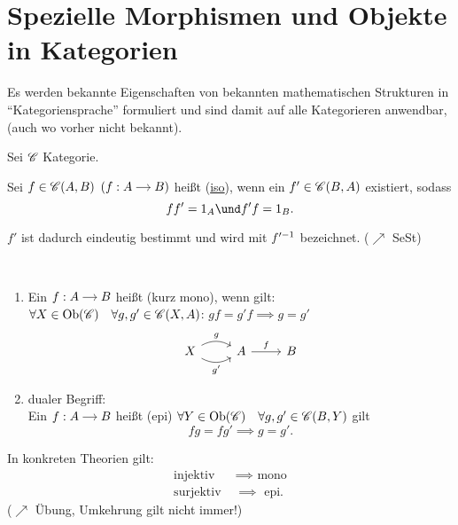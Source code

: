 \chapter{Spezielle Morphismen und Objekte in Kategorien}
\begin{bemerkung}
	Es werden bekannte Eigenschaften von bekannten mathematischen Strukturen in ``Kategoriensprache'' formuliert und sind damit auf alle Kategorieren anwendbar, (auch wo vorher nicht bekannt).
\end{bemerkung}
Sei $\mathscr C$ Kategorie.
\begin{definition}[Isomorphismus]
	Sei $f \in \mathscr C(A,B)$ $(f: \begin{tikzcd}[cramped, sep=small]
	A \arrow[r] & B
	\end{tikzcd})$ heißt  (\ul{iso}), wenn ein $f' \in \mathscr C(B,A)$ existiert, sodass
	\[
		ff' = 1_A \und f' f = 1_B.
	\]
\end{definition}
\begin{bemerkung}
	$f'$ ist dadurch eindeutig bestimmt und wird mit $f'^{-1}$ bezeichnet. ($\nearrow$ SeSt)
\end{bemerkung}
\begin{definition}\
	\begin{enumerate}[label=]
		\item Ein $f: \begin{tikzcd}[cramped, sep=small]
		A \arrow[r] & B
		\end{tikzcd}$ heißt  (kurz mono), wenn gilt:\\
		$\forall X \in \operatorname{Ob}(\mathscr C) \quad \forall g,g' \in \mathscr C(X,A)$: $gf = g'f \implies g = g'$
		\[
		\begin{tikzcd}
		X \arrow[r, bend left, "g"] \arrow[r, bend right, "{g'}"'] & A \arrow[r, "f"] & B
		\end{tikzcd}
		\]
		\item dualer Begriff:\\
		Ein $f: \begin{tikzcd}[cramped, sep=small]
		A \arrow[r] & B
		\end{tikzcd}$ heißt  (epi) $\forall Y \in \operatorname{Ob}(\mathscr C)\quad \forall g,g' \in \mathscr C(B,Y)$ gilt
		\[
		fg = fg' \implies g=g'.
		\]
	\end{enumerate}
\end{definition}
\begin{bemerkung}
	In konkreten Theorien gilt:
	\begin{align*}
		\text{injektiv} &\implies \text{ mono}\\
		\text{surjektiv } &\implies \text{ epi}.
	\end{align*}
	($\nearrow$ Übung, Umkehrung gilt nicht immer!)
\end{bemerkung}